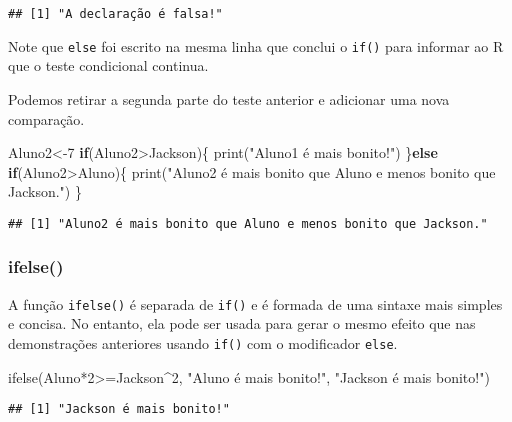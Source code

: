 \documentclass[
]{book}
\newenvironment{Shaded}{\begin{snugshade}}{\end{snugshade}}
\newcommand{\ControlFlowTok}[1]{\textcolor[rgb]{0.13,0.29,0.53}{\textbf{#1}}}
\newcommand{\DecValTok}[1]{\textcolor[rgb]{0.00,0.00,0.81}{#1}}
\newcommand{\FunctionTok}[1]{\textcolor[rgb]{0.00,0.00,0.00}{#1}}
\newcommand{\NormalTok}[1]{#1}
\newcommand{\OtherTok}[1]{\textcolor[rgb]{0.56,0.35,0.01}{#1}}
\newcommand{\SpecialCharTok}[1]{\textcolor[rgb]{0.00,0.00,0.00}{#1}}
\newcommand{\StringTok}[1]{\textcolor[rgb]{0.31,0.60,0.02}{#1}}
\begin{document}
\begin{verbatim}
## [1] "A declaração é falsa!"
\end{verbatim}

Note que \texttt{else} foi escrito na mesma linha que conclui o \texttt{if()} para informar ao R que o teste condicional continua.

Podemos retirar a segunda parte do teste anterior e adicionar uma nova comparação.

\begin{Shaded}
\begin{Highlighting}[]
\NormalTok{Aluno2}\OtherTok{\textless{}{-}}\DecValTok{7}
\ControlFlowTok{if}\NormalTok{(Aluno2}\SpecialCharTok{\textgreater{}}\NormalTok{Jackson)\{}
    \FunctionTok{print}\NormalTok{(}\StringTok{"Aluno1 é mais bonito!"}\NormalTok{)}
\NormalTok{  \}}\ControlFlowTok{else} \ControlFlowTok{if}\NormalTok{(Aluno2}\SpecialCharTok{\textgreater{}}\NormalTok{Aluno)\{}
    \FunctionTok{print}\NormalTok{(}\StringTok{"Aluno2 é mais bonito que Aluno e menos bonito que Jackson."}\NormalTok{)}
\NormalTok{    \}}
\end{Highlighting}
\end{Shaded}

\begin{verbatim}
## [1] "Aluno2 é mais bonito que Aluno e menos bonito que Jackson."
\end{verbatim}

\hypertarget{ifelse}{%
\subsubsection{ifelse()}\label{ifelse}}

A função \texttt{ifelse()} é separada de \texttt{if()} e é formada de uma sintaxe mais simples e concisa. No entanto, ela pode ser usada para gerar o mesmo efeito que nas demonstrações anteriores usando \texttt{if()} com o modificador \texttt{else}.

\begin{Shaded}
\begin{Highlighting}[]
\FunctionTok{ifelse}\NormalTok{(Aluno}\SpecialCharTok{*}\DecValTok{2}\SpecialCharTok{\textgreater{}=}\NormalTok{Jackson}\SpecialCharTok{\^{}}\DecValTok{2}\NormalTok{, }\StringTok{"Aluno é mais bonito!"}\NormalTok{, }\StringTok{"Jackson é mais bonito!"}\NormalTok{)}
\end{Highlighting}
\end{Shaded}

\begin{verbatim}
## [1] "Jackson é mais bonito!"
\end{verbatim}
\end{document}
